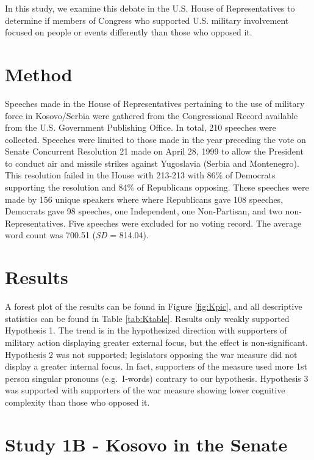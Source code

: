 \documentclass[english,,man,floatsintext]{apa6}
\begin{document}
In this study, we examine this debate in the U.S. House of Representatives to determine if members of Congress who supported U.S. military involvement focused on people or events differently than those who opposed it.

\hypertarget{method-1}{%
\section{Method}\label{method-1}}

Speeches made in the House of Representatives pertaining to the use of military force in Kosovo/Serbia were gathered from the Congressional Record available from the U.S. Government Publishing Office. In total, 210 speeches were collected. Speeches were limited to those made in the year preceding the vote on Senate Concurrent Resolution 21 made on April 28, 1999 to allow the President to conduct air and missile strikes against Yugoslavia (Serbia and Montenegro). This resolution failed in the House with 213-213 with 86\% of Democrats supporting the resolution and 84\% of Republicans opposing. These speeches were made by 156 unique speakers where where Republicans gave 108 speeches, Democrats gave 98 speeches, one Independent, one Non-Partisan, and two non-Representatives. Five speeches were excluded for no voting record. The average word count was 700.51 (\emph{SD} = 814.04).

\hypertarget{results}{%
\section{Results}\label{results}}

A forest plot of the results can be found in Figure \ref{fig:Kpic}, and all descriptive statistics can be found in Table \ref{tab:Ktable}. Results only weakly supported Hypothesis 1. The trend is in the hypothesized direction with supporters of military action displaying greater external focus, but the effect is non-significant. Hypothesis 2 was not supported; legislators opposing the war measure did not display a greater internal focus. In fact, supporters of the measure used more 1st person singular pronouns (e.g.~I-words) contrary to our hypothesis. Hypothesis 3 was supported with supporters of the war measure showing lower cognitive complexity than those who opposed it.

\hypertarget{study-1b---kosovo-in-the-senate}{%
\section{Study 1B - Kosovo in the Senate}\label{study-1b---kosovo-in-the-senate}}
\end{document}
